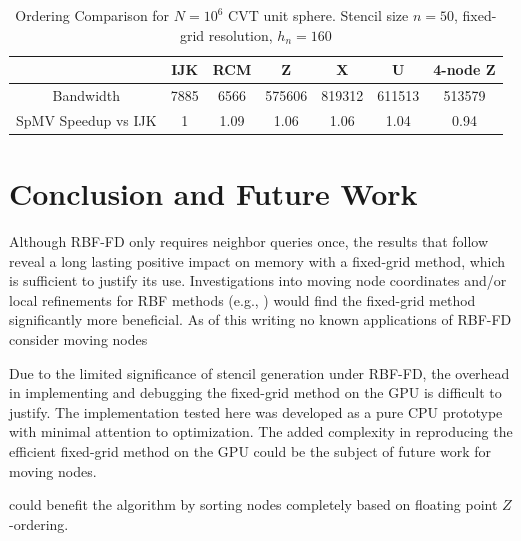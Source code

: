 \documentclass{report}
\begin{document}
\begin{table}[h]\footnotesize
  \centering
  \caption{Ordering Comparison for $N=10^6$ CVT unit sphere. Stencil size $n=50$, fixed-grid resolution, $h_n=160$}
  \begin{tabular}{ c | c | c | c | c | c | c }
               & IJK & RCM & Z & X & U & 4-node Z \\
               \hline
   Bandwidth   &  7885	& 6566	& 575606 &	819312 & 611513 & 513579   \\
   \hline
   SpMV Speedup vs IJK & 1 &	1.09 & 1.06 & 1.06 & 1.04 & 0.94 \\
  \end{tabular}
\end{table}





\section{Conclusion and Future Work}



Although RBF-FD only requires neighbor queries once, the results that follow reveal a long lasting positive impact on memory with a fixed-grid method, which is sufficient to justify its use. Investigations into moving node coordinates and/or local refinements for RBF methods (e.g., \cite{FlyerLehto10}) would find the fixed-grid method significantly more beneficial. As of this writing no known applications of RBF-FD consider moving nodes

Due to the limited significance of stencil generation under RBF-FD, the overhead in implementing and debugging the fixed-grid method on the GPU is difficult to justify. The implementation tested here was developed as a pure CPU prototype with minimal attention to optimization. The added complexity in reproducing the efficient fixed-grid method on the GPU could be the subject of future work for moving nodes. 

\cite{Connor2009} could benefit the algorithm by sorting nodes completely based on floating point $Z$-ordering.
\end{document}
